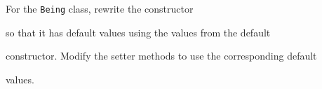 For the \texttt{Being} class, rewrite the constructor

so that it has default values using the values from the default

constructor. Modify the setter methods to use the corresponding default

values.

